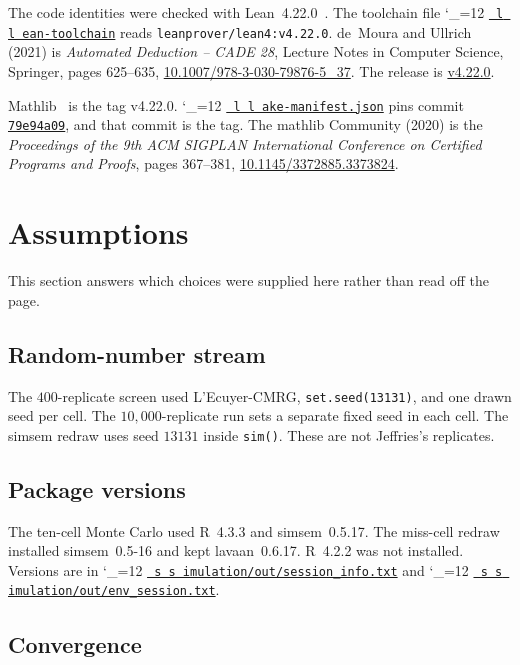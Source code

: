 \documentclass[11pt]{article}
\makeatletter
\newcommand{\proofbase}{https://github.com/alectionary/vibe-math/blob/master/formalization/latent-contrasts}
\def\latent@show#1{%
  \ifx\relax#1\else
    #1\allowbreak
    \expandafter\latent@show
  \fi}
\newcommand{\src}{\begingroup\catcode`\_=12 \latent@src}
\newcommand{\latent@src}[1]{%
  \edef\srcurl{\proofbase/#1}%
  \href{\srcurl}{\texttt{\latent@show#1\relax}}\endgroup}
\makeatother
\begin{document}
The code identities were checked with Lean~4.22.0~\cite{demoura2021}.
The toolchain file \src{lean-toolchain} reads
\texttt{leanprover/lean4:v4.22.0}.
de~Moura and Ullrich (2021) is \emph{Automated Deduction -- CADE 28},
Lecture Notes in Computer Science, Springer, pages 625--635,
\href{https://doi.org/10.1007/978-3-030-79876-5_37}{10.1007/978-3-030-79876-5\_37}.
The release is
\href{https://github.com/leanprover/lean4/releases/tag/v4.22.0}{v4.22.0}.

Mathlib~\cite{mathlib2020} is the tag v4.22.0.
\src{lake-manifest.json} pins commit
\href{https://github.com/leanprover-community/mathlib4/commit/79e94a093aff4a60fb1b1f92d9681e407124c2ca}{\texttt{79e94a09}},
and that commit is the tag.
The mathlib Community (2020) is the \emph{Proceedings of the 9th ACM
SIGPLAN International Conference on Certified Programs and Proofs},
pages 367--381,
\href{https://doi.org/10.1145/3372885.3373824}{10.1145/3372885.3373824}.

\section{Assumptions}
\label{sec:assumptions}

This section answers which choices were supplied here rather than read
off the page.

\subsection{Random-number stream}

The \(400\)-replicate screen used L'Ecuyer-CMRG, \texttt{set.seed(13131)},
and one drawn seed per cell. The \(10{,}000\)-replicate run sets a
separate fixed seed in each cell. The simsem redraw uses seed \(13131\)
inside \texttt{sim()}. These are not Jeffries's replicates.

\subsection{Package versions}

The ten-cell Monte Carlo used R~4.3.3 and simsem~0.5.17. The miss-cell
redraw installed simsem~0.5-16 and kept lavaan~0.6.17. R~4.2.2 was not
installed. Versions are in \src{simulation/out/session_info.txt} and
\src{simulation/out/env_session.txt}.

\subsection{Convergence}
\end{document}
